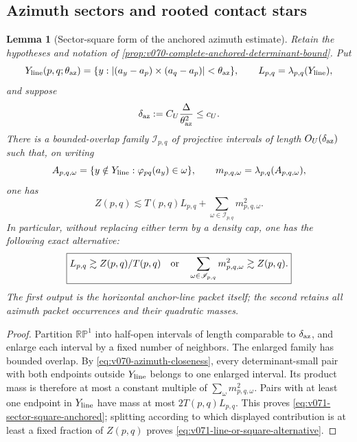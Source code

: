 \documentclass[10pt]{article}
\newtheorem{lemma}[theorem]{Lemma}
\begin{document}
\subsection{Azimuth sectors and rooted contact stars}

\begin{lemma}[Sector-square form of the anchored azimuth estimate]
\label{lem:v071-azimuth-sector-square}
Retain the hypotheses and notation of
\cref{prop:v070-complete-anchored-determinant-bound}.  Put
\[
Y_{\rm line}(p,q;\theta_{\rm az})
=
\{y:|(a_y-a_p)\times(a_q-a_p)|<\theta_{\rm az}\},
\qquad
L_{p,q}=\lambda_{p,q}(Y_{\rm line}),
\]
and suppose
\[
\delta_{\rm az}:=C_U\frac{\Delta}{\theta_{\rm az}^2}\le c_U.
\]
There is a bounded-overlap family \(\mathscr I_{p,q}\) of projective intervals of length
\(O_U(\delta_{\rm az})\) such that, on writing
\[
A_{p,q,\omega}
=
\{y\notin Y_{\rm line}:\varphi_{pq}(a_y)\in\omega\},
\qquad
m_{p,q,\omega}=\lambda_{p,q}(A_{p,q,\omega}),
\]
one has
\begin{equation}
\label{eq:v071-sector-square-anchored}
\boxed{
Z(p,q)
\lesssim
T(p,q)L_{p,q}
+
\sum_{\omega\in\mathscr I_{p,q}}m_{p,q,\omega}^{2}.
}
\end{equation}
In particular, without replacing either term by a density cap, one has the following exact
alternative:
\begin{equation}
\label{eq:v071-line-or-square-alternative}
\boxed{
L_{p,q}\gtrsim Z(p,q)/T(p,q)
\quad\hbox{or}\quad
\sum_{\omega\in\mathscr I_{p,q}}m_{p,q,\omega}^{2}
\gtrsim Z(p,q).
}
\end{equation}
The first output is the horizontal anchor-line packet itself; the second retains all azimuth
packet occurrences and their quadratic masses.
\end{lemma}

\begin{proof}
Partition \(\mathbb{RP}^1\) into half-open intervals of length comparable to
\(\delta_{\rm az}\), and enlarge each interval by a fixed number of neighbors.  The enlarged
family has bounded overlap.  By \eqref{eq:v070-azimuth-closeness}, every determinant-small pair
with both endpoints outside \(Y_{\rm line}\) belongs to one enlarged interval.  Its product mass
is therefore at most a constant multiple of
\(\sum_\omega m_{p,q,\omega}^2\).  Pairs with at least one endpoint in
\(Y_{\rm line}\) have mass at most \(2T(p,q)L_{p,q}\).  This proves
\eqref{eq:v071-sector-square-anchored}; splitting according to which displayed contribution is at
least a fixed fraction of \(Z(p,q)\) proves
\eqref{eq:v071-line-or-square-alternative}.
\end{proof}
\end{document}
